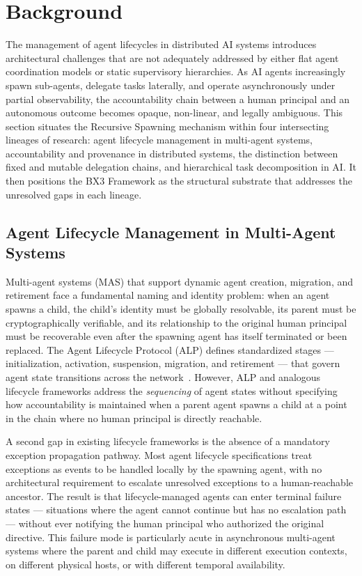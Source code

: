 \section{Background}
\label{sec:background}

The management of agent lifecycles in distributed AI systems introduces architectural challenges that are not adequately addressed by either flat agent coordination models or static supervisory hierarchies. As AI agents increasingly spawn sub-agents, delegate tasks laterally, and operate asynchronously under partial observability, the accountability chain between a human principal and an autonomous outcome becomes opaque, non-linear, and legally ambiguous. This section situates the Recursive Spawning mechanism within four intersecting lineages of research: agent lifecycle management in multi-agent systems, accountability and provenance in distributed systems, the distinction between fixed and mutable delegation chains, and hierarchical task decomposition in AI. It then positions the BX3 Framework as the structural substrate that addresses the unresolved gaps in each lineage.

\subsection{Agent Lifecycle Management in Multi-Agent Systems}
\label{sec:lifecycle}

Multi-agent systems (MAS) that support dynamic agent creation, migration, and retirement face a fundamental naming and identity problem: when an agent spawns a child, the child's identity must be globally resolvable, its parent must be cryptographically verifiable, and its relationship to the original human principal must be recoverable even after the spawning agent has itself terminated or been replaced. The Agent Lifecycle Protocol (ALP) defines standardized stages — initialization, activation, suspension, migration, and retirement — that govern agent state transitions across the network~\cite{alp2026,ualm2025}. However, ALP and analogous lifecycle frameworks address the \emph{sequencing} of agent states without specifying how accountability is maintained when a parent agent spawns a child at a point in the chain where no human principal is directly reachable.

A second gap in existing lifecycle frameworks is the absence of a mandatory exception propagation pathway. Most agent lifecycle specifications treat exceptions as events to be handled locally by the spawning agent, with no architectural requirement to escalate unresolved exceptions to a human-reachable ancestor. The result is that lifecycle-managed agents can enter terminal failure states — situations where the agent cannot continue but has no escalation path — without ever notifying the human principal who authorized the original directive. This failure mode is particularly acute in asynchronous multi-agent systems where the parent and child may execute in different execution contexts, on different physical hosts, or with different temporal availability.

